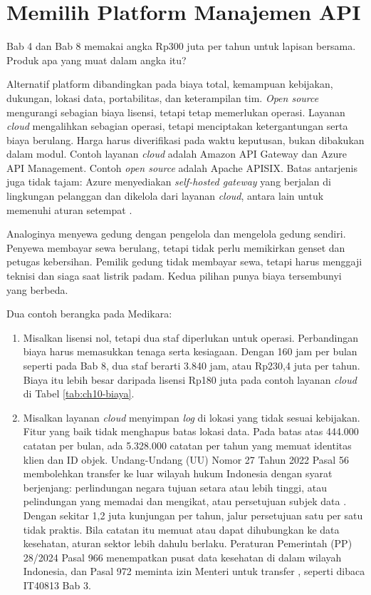 \section{Memilih Platform Manajemen API}

Bab 4 dan Bab 8 memakai angka Rp300 juta per tahun untuk lapisan bersama. Produk apa yang muat dalam angka itu?

Alternatif platform dibandingkan pada biaya total, kemampuan kebijakan, dukungan, lokasi data, portabilitas, dan
keterampilan tim. \textit{Open source} mengurangi sebagian biaya lisensi, tetapi tetap memerlukan operasi. Layanan
\textit{cloud} mengalihkan sebagian operasi, tetapi menciptakan ketergantungan serta biaya berulang. Harga harus
diverifikasi pada waktu keputusan, bukan dibakukan dalam modul. Contoh layanan \textit{cloud} adalah Amazon API Gateway
dan Azure API Management. Contoh \textit{open source} adalah Apache APISIX. Batas antarjenis juga tidak tajam: Azure
menyediakan \textit{self-hosted gateway} yang berjalan di lingkungan pelanggan dan dikelola dari layanan \textit{cloud},
antara lain untuk memenuhi aturan setempat \cite{azure-apim}.

Analoginya menyewa gedung dengan pengelola dan mengelola gedung sendiri. Penyewa membayar sewa berulang, tetapi tidak
perlu memikirkan genset dan petugas kebersihan. Pemilik gedung tidak membayar sewa, tetapi harus menggaji teknisi dan
siaga saat listrik padam. Kedua pilihan punya biaya tersembunyi yang berbeda.

Dua contoh berangka pada Medikara:
\begin{enumerate}
  \item Misalkan lisensi nol, tetapi dua staf diperlukan untuk operasi. Perbandingan biaya harus memasukkan tenaga serta
        kesiagaan. Dengan 160 jam per bulan seperti pada Bab 8, dua staf berarti 3.840 jam, atau Rp230,4 juta per tahun.
        Biaya itu lebih besar daripada lisensi Rp180 juta pada contoh layanan \textit{cloud} di Tabel
        \ref{tab:ch10-biaya}.
  \item Misalkan layanan \textit{cloud} menyimpan \textit{log} di lokasi yang tidak sesuai kebijakan. Fitur yang baik
        tidak menghapus batas lokasi data. Pada batas atas 444.000 catatan per bulan, ada 5.328.000 catatan per tahun
        yang memuat identitas klien dan ID objek. Undang-Undang (UU) Nomor 27 Tahun 2022 Pasal 56 membolehkan transfer
        ke luar wilayah hukum Indonesia dengan syarat berjenjang: perlindungan negara tujuan setara atau lebih tinggi,
        atau pelindungan yang memadai dan mengikat, atau persetujuan subjek data \cite{uu27-2022-pdp}. Dengan sekitar
        1,2 juta kunjungan per tahun, jalur persetujuan satu per satu tidak praktis. Bila catatan itu memuat atau dapat
        dihubungkan ke data kesehatan, aturan sektor lebih dahulu berlaku. Peraturan Pemerintah (PP) 28/2024 Pasal 966 menempatkan pusat data
        kesehatan di dalam wilayah Indonesia, dan Pasal 972 meminta izin Menteri untuk transfer \cite{pp28-2024-kesehatan},
        seperti dibaca IT40813 Bab 3.
\end{enumerate}

